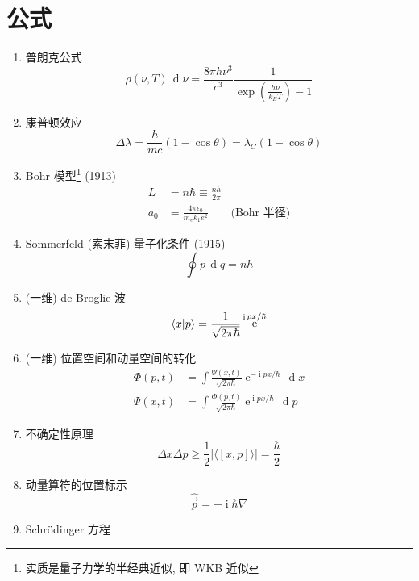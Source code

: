 \documentclass[11pt,a4paper,twocolumn,fleqn]{article}%
\DeclareMathOperator{\diff}{\, d}
\DeclareMathOperator{\mi}{i}
\DeclareMathOperator{\e}{e}%
\renewcommand{\[}{~$}
\renewcommand{\]}{$~}%
\begin{document}
\section{公式}
 \begin{enumerate}
 \setlength\abovedisplayskip{5pt} 
 \setlength\belowdisplayskip{0pt} 
 \setlength\itemsep{0pt}
  \item 普朗克公式
  	\begin{equation}
  	 \rho (\nu , T) \diff\nu = \frac{8\pi h\nu^3}{c^3}\frac{1}{\exp(\frac{h\nu}{k_B T}) - 1}
  	\end{equation}
  \item 康普顿效应
  	\begin{equation}
  	 \Delta \lambda = \frac{h}{mc}(1-\cos \theta) = \lambda_C(1-\cos \theta)
  	\end{equation}
  \item Bohr 模型\footnote{实质是量子力学的半经典近似, 即 WKB 近似} (1913)
  	 \begin{align}
  	  L &= n\hbar \equiv \frac{nh}{2\pi} \\
  	  a_0 &= \frac{4\pi\epsilon_0}{m_e k_1 e^2} &\mbox{(Bohr 半径)}
  	 \end{align}
  \item Sommerfeld (索末菲) 量子化条件 (1915)
  	 \begin{equation}
  	  \oint p\diff q = nh
  	 \end{equation}
  \item (一维) de Broglie 波
  	\begin{equation}
  	 \braket{x|p} = \frac{1}{\sqrt{2\pi\hbar}}\e^{\mi px/\hbar}
  	\end{equation}
  \item (一维) 位置空间和动量空间的转化
  	\begin{align}
  	 \Phi (p,t) &= \int \frac{\Psi (x,t) }{\sqrt{2\pi\hbar}}\e^{-\mi px/\hbar}\diff x \\
  	 \Psi (x,t) &= \int \frac{\Phi (p,t) }{\sqrt{2\pi\hbar}}\e^{\mi px/\hbar} \diff p
  	\end{align}
  \item 不确定性原理
  	\begin{equation}
  	 \Delta x \Delta p \ge \frac 12 |\langle [x,p]\rangle| = \frac{\hbar}{2}
  	\end{equation}
  \item 动量算符的位置标示
  	\begin{equation}
  	 \hat\vec p = -\mi\hbar\nabla
  	\end{equation}
  \item Schr\"odinger 方程

\end{enumerate}
\end{document}
